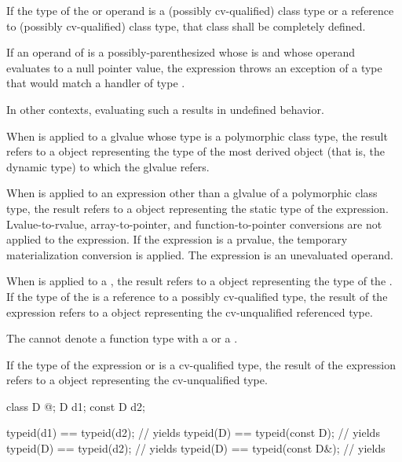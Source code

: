 \pnum
If the type of the  or  operand is
a (possibly cv-qualified) class type or
a reference to (possibly cv-qualified) class type,
that class shall be completely defined.

\pnum
If an  operand of  is
a possibly-parenthesized 
whose  is \tcode{*} and
whose operand evaluates to a null pointer value,
the  expression throws an exception
of a type that would match a handler of type
%
%
.
\begin{note}
In other contexts, evaluating such a 
results in undefined behavior.
\end{note}

\pnum
When  is applied to a glvalue whose type is a
polymorphic class type, the result refers to a
 object representing the type of the most derived
object (that is, the dynamic type) to which the
glvalue refers.

\pnum
When  is applied to an expression other than a glvalue of
a polymorphic class type, the result refers to a 
object representing the static type of the expression.
Lvalue-to-rvalue, array-to-pointer,
and function-to-pointer conversions are not applied to
the expression.
If the expression is a prvalue,
the temporary materialization conversion
is applied.
The expression is an unevaluated operand.

\pnum
When  is applied to a , the result
refers to a  object representing the type of the
. If the type of the  is a reference
to a possibly cv-qualified type, the result of the
 expression refers to a  object
representing the cv-unqualified referenced type.
\begin{note}
The  cannot denote a function type with
a  or a .
\end{note}

\pnum
If the type of the expression or  is a
cv-qualified type, the result of the  expression refers
to a  object representing the cv-unqualified
type.
\begin{example}
\begin{codeblock}
class D { @\commentellip@ };
D d1;
const D d2;

typeid(d1) == typeid(d2);       // yields 
typeid(D)  == typeid(const D);  // yields 
typeid(D)  == typeid(d2);       // yields 
typeid(D)  == typeid(const D&); // yields 
\end{codeblock}
\end{example}

